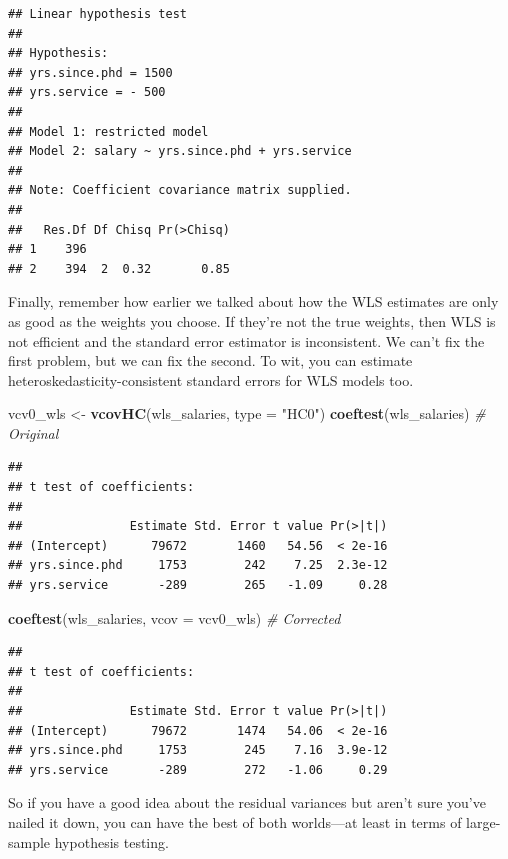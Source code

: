 \documentclass[12pt,oneside,openany]{book}
\newenvironment{Shaded}{\begin{snugshade}}{\end{snugshade}}
\newcommand{\KeywordTok}[1]{\textcolor[rgb]{0.13,0.29,0.53}{\textbf{#1}}}
\newcommand{\DataTypeTok}[1]{\textcolor[rgb]{0.13,0.29,0.53}{#1}}
\newcommand{\StringTok}[1]{\textcolor[rgb]{0.31,0.60,0.02}{#1}}
\newcommand{\CommentTok}[1]{\textcolor[rgb]{0.56,0.35,0.01}{\textit{#1}}}
\newcommand{\NormalTok}[1]{#1}
\begin{document}
\begin{verbatim}
## Linear hypothesis test
## 
## Hypothesis:
## yrs.since.phd = 1500
## yrs.service = - 500
## 
## Model 1: restricted model
## Model 2: salary ~ yrs.since.phd + yrs.service
## 
## Note: Coefficient covariance matrix supplied.
## 
##   Res.Df Df Chisq Pr(>Chisq)
## 1    396                    
## 2    394  2  0.32       0.85
\end{verbatim}

Finally, remember how earlier we talked about how the WLS estimates are
only as good as the weights you choose. If they're not the true weights,
then WLS is not efficient and the standard error estimator is
inconsistent. We can't fix the first problem, but we can fix the second.
To wit, you can estimate heteroskedasticity-consistent standard errors
for WLS models too.

\begin{Shaded}
\begin{Highlighting}[]
\NormalTok{vcv0_wls <-}\StringTok{ }\KeywordTok{vcovHC}\NormalTok{(wls_salaries, }\DataTypeTok{type =} \StringTok{"HC0"}\NormalTok{)}
\KeywordTok{coeftest}\NormalTok{(wls_salaries)  }\CommentTok{# Original}
\end{Highlighting}
\end{Shaded}

\begin{verbatim}
## 
## t test of coefficients:
## 
##               Estimate Std. Error t value Pr(>|t|)
## (Intercept)      79672       1460   54.56  < 2e-16
## yrs.since.phd     1753        242    7.25  2.3e-12
## yrs.service       -289        265   -1.09     0.28
\end{verbatim}

\begin{Shaded}
\begin{Highlighting}[]
\KeywordTok{coeftest}\NormalTok{(wls_salaries, }\DataTypeTok{vcov =}\NormalTok{ vcv0_wls)  }\CommentTok{# Corrected}
\end{Highlighting}
\end{Shaded}

\begin{verbatim}
## 
## t test of coefficients:
## 
##               Estimate Std. Error t value Pr(>|t|)
## (Intercept)      79672       1474   54.06  < 2e-16
## yrs.since.phd     1753        245    7.16  3.9e-12
## yrs.service       -289        272   -1.06     0.29
\end{verbatim}

So if you have a good idea about the residual variances but aren't sure
you've nailed it down, you can have the best of both worlds---at least
in terms of large-sample hypothesis testing.
\end{document}
